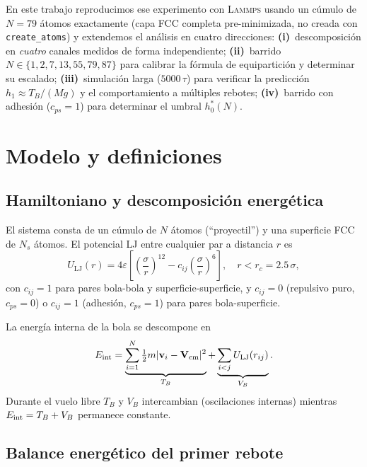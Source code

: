 \documentclass[aps,pre,twocolumn,reprint,superscriptaddress]{revtex4-2}
\newcommand{\eps}{\varepsilon}
\newcommand{\lammps}{\textsc{Lammps}}
\begin{document}
En este trabajo reproducimos ese experimento con \lammps{} usando un cúmulo de
$N=79$ átomos exactamente (capa FCC completa pre-minimizada, no creada con
\texttt{create\_atoms}) y extendemos el análisis en cuatro direcciones:
\textbf{(i)}~descomposición en \emph{cuatro} canales medidos de forma independiente;
\textbf{(ii)}~barrido $N\in\{1,2,7,13,55,79,87\}$ para calibrar la fórmula de
equipartición y determinar su escalado;
\textbf{(iii)}~simulación larga ($5000\,\tau$) para verificar la predicción
$h_1\approx T_B/(Mg)$ y el comportamiento a múltiples rebotes;
\textbf{(iv)}~barrido con adhesión ($c_{ps}=1$) para determinar el umbral
$h_0^*(N)$.

\section{Modelo y definiciones}
\label{sec:modelo}

\subsection{Hamiltoniano y descomposición energética}
\label{sec:hamiltoniano}

El sistema consta de un cúmulo de $N$ átomos (``proyectil'') y una superficie
FCC de $N_s$ átomos. El potencial LJ entre cualquier par a distancia $r$ es
\begin{equation}
    U_{\mathrm{LJ}}(r) = 4\eps \left[ \left(\frac{\sigma}{r}\right)^{12}
    - c_{ij}\left(\frac{\sigma}{r}\right)^{6} \right],
    \quad r < r_c = 2.5\,\sigma,
    \label{eq:lj}
\end{equation}
con $c_{ij}=1$ para pares bola-bola y superficie-superficie, y $c_{ij}=0$
(repulsivo puro, $c_{ps}=0$) o $c_{ij}=1$ (adhesión, $c_{ps}=1$) para
pares bola-superficie.

La energía interna de la bola se descompone en
\begin{equation}
    E_{\mathrm{int}} =
    \underbrace{\sum_{i=1}^{N}\tfrac{1}{2}m|\mathbf{v}_i-\mathbf{V}_{\rm cm}|^2}_{T_B}
    +
    \underbrace{\sum_{i<j}U_{\mathrm{LJ}}(r_{ij})}_{V_B}.
    \label{eq:TB_VB}
\end{equation}
Durante el vuelo libre $T_B$ y $V_B$ intercambian (oscilaciones internas)
mientras $E_{\rm int}=T_B+V_B$ permanece constante.

\subsection{Balance energético del primer rebote}
\label{sec:balance}
\end{document}
